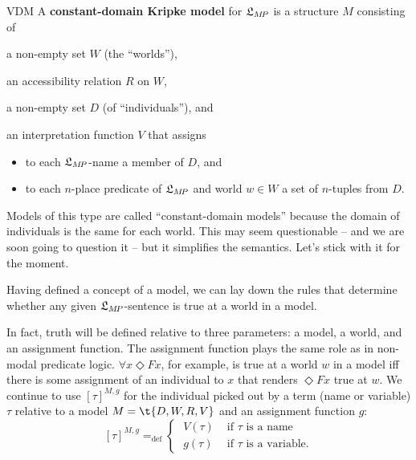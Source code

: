 \begin{definition}{}{VDM}
  A \textbf{constant-domain Kripke model} for $\mathfrak{L}_{M\!P}$ is a structure $M$
  consisting of%
  \medskip
  \begin{compactenum}
    \item a non-empty set $W$ (the ``worlds''),
    \item an accessibility relation $R$ on $W$,
    \item a non-empty set $D$ (of ``individuals''), and
    \item an interpretation function $V$ that assigns%
    \vspace{-1mm}
    \begin{itemize}
      \itemsep-1mm
      \item to each $\mathfrak{L}_{M\!P}$-name a member of $D$, and
      \item to each $n$-place predicate of $\mathfrak{L}_{M\!P}$ and world $w \in W$ a set of
            $n$-tuples from $D$.
    \end{itemize}
  \end{compactenum}
\end{definition}

Models of this type are called ``constant-domain models'' because the domain of
individuals is the same for each world. This may seem questionable -- and we are
soon going to question it -- but it simplifies the semantics. Let’s stick
with it for the moment.

Having defined a concept of a model, we can lay down the rules that determine
whether any given $\mathfrak{L}_{M\!P}$-sentence is true at a world in a model.

In fact, truth will be defined relative to three parameters: a model, a world,
and an assignment function. The assignment function plays the same role as in
non-modal predicate logic. $\forall x \Diamond Fx$, for example, is true at a
world $w$ in a model iff there is some assignment of an individual to $x$ that
renders $\Diamond Fx$ true at $w$. We continue to use $[\tau]^{M,g}$ for the
individual picked out by a term (name or variable) $\tau$ relative to a model
$M = \t{D,W,R,V}$ and an assignment function $g$:
\[
  [\tau]^{M,g} =_\text{def} \begin{cases} \;V(\tau) & \text{ if $\tau$ is a name}\\
    \;g(\tau) & \text{ if $\tau$ is a variable}.
  \end{cases}
\]

